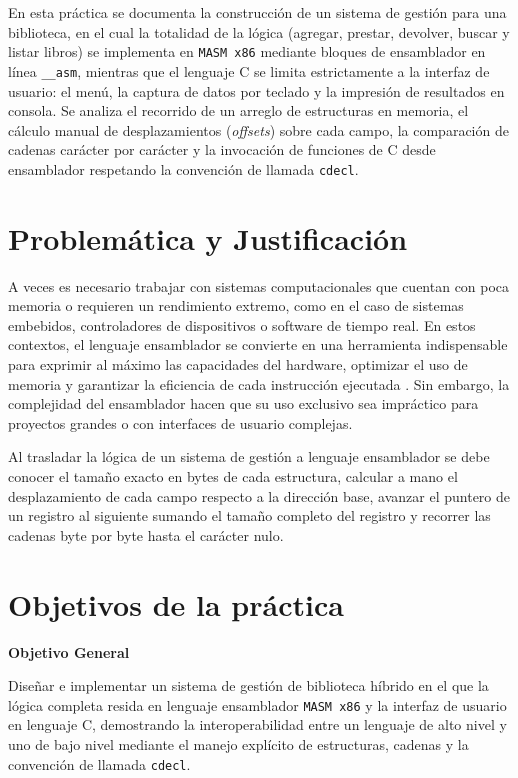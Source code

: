 \documentclass[a4paper,12pt]{article}
\begin{document}
En esta práctica se documenta la construcción de un sistema de gestión para una biblioteca, en el cual la totalidad de la lógica (agregar, prestar, devolver, buscar y listar libros) se implementa en \texttt{MASM x86} mediante bloques de ensamblador en línea \texttt{\_\_asm}, mientras que el lenguaje C se limita estrictamente a la interfaz de usuario: el menú, la captura de datos por teclado y la impresión de resultados en consola. Se analiza el recorrido de un arreglo de estructuras en memoria, el cálculo manual de desplazamientos (\textit{offsets}) sobre cada campo, la comparación de cadenas carácter por carácter y la invocación de funciones de C desde ensamblador respetando la convención de llamada \texttt{cdecl}.

\section{Problemática y Justificación}
A veces es necesario trabajar con sistemas computacionales que cuentan con poca memoria o requieren un rendimiento extremo, como en el caso de sistemas embebidos, controladores de dispositivos o software de tiempo real. En estos contextos, el lenguaje ensamblador se convierte en una herramienta indispensable para exprimir al máximo las capacidades del hardware, optimizar el uso de memoria y garantizar la eficiencia de cada instrucción ejecutada \cite{stallings2019computer}. Sin embargo, la complejidad del ensamblador hacen que su uso exclusivo sea impráctico para proyectos grandes o con interfaces de usuario complejas.

Al trasladar la lógica de un sistema de gestión a lenguaje ensamblador se debe conocer el tamaño exacto en bytes de cada estructura, calcular a mano el desplazamiento de cada campo respecto a la dirección base, avanzar el puntero de un registro al siguiente sumando el tamaño completo del registro y recorrer las cadenas byte por byte hasta el carácter nulo. 

\section{Objetivos de la práctica}
\textbf{Objetivo General}

Diseñar e implementar un sistema de gestión de biblioteca híbrido en el que la lógica completa resida en lenguaje ensamblador \texttt{MASM x86} y la interfaz de usuario en lenguaje C, demostrando la interoperabilidad entre un lenguaje de alto nivel y uno de bajo nivel mediante el manejo explícito de estructuras, cadenas y la convención de llamada \texttt{cdecl}.
\end{document}
